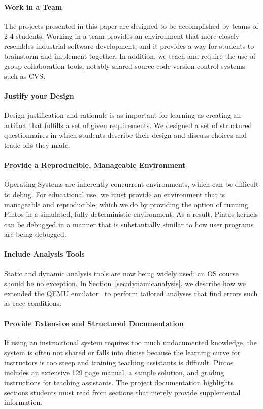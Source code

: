 \paragraph{Work in a Team}
The projects presented in this paper are designed to be accomplished by teams of 
2-4 students.  Working in a team provides an environment that more closely resembles
industrial software development, and it provides a way for students to brainstorm and
implement together.  In addition, we teach and require the use of group collaboration tools,
notably shared source code version control systems such as CVS.

\paragraph{Justify your Design}
Design justification and rationale is as important for learning as creating an artifact 
that fulfills a set of given requirements.  We designed a set of structured questionnaires 
in which students describe their design and discuss choices and trade-offs they made.

\paragraph{Provide a Reproducible, Manageable Environment}
Operating Systems are inherently concurrent environments, which can be difficult
to debug.  For educational use, we must provide an environment that is
manageable and reproducible, which we do by providing the option
of running Pintos in a simulated, fully deterministic environment.  
As a result, Pintos kernels can be debugged in a manner that
is substantially similar to how user programs are being debugged.

\paragraph{Include Analysis Tools}
Static and dynamic analysis tools are now being widely used; an OS course should
be no exception.  In Section~\ref{sec:dynamicanalysis}, we describe how we 
extended the QEMU emulator~\cite{Bellard2005QEMU} to 
perform tailored analyses that find errors such as race conditions.

\paragraph{Provide Extensive and Structured Documentation}
If using an instructional system requires too much undocumented knowledge,
the system is often not shared or falls into disuse because the learning curve
for instructors is too steep and training teaching assistants is difficult.
Pintos includes an extensive 129 page manual, a sample solution,
and grading instructions for teaching assistants.  The project documentation 
highlights sections students must read from sections that merely provide supplemental information.

